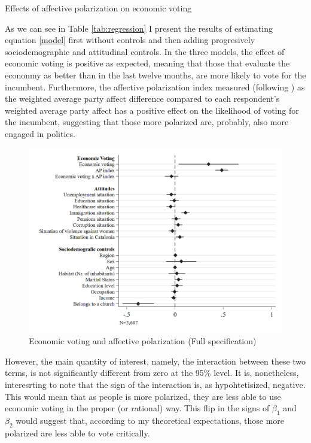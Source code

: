 \documentclass[a4paper, svgnames]{article}
\begin{document}
\begin{table}[H]
	\label{coefplot}
\centering
\caption{\label{tab:regression} Effects of affective polarization on economic voting}


\end{table}

As we can see in Table \ref*{tab:regression} I present the results of estimating equation \ref*{model} first without controls and then adding progresively sociodemographic and attitudinal controls. In the three models, the effect of economic voting is positive as expected, meaning that those that evaluate the econonmy as better than in the last twelve months, are more likely to vote for the incumbent. Furthermore, the affective polarization index measured (following \citep*{Wagner2021}) as the weighted average party affect difference compared to each respondent's weighted average party affect has a positive effect on the likelihood of voting for the incumbent, suggesting that those more polarized are, probably, also more engaged in politics.

\begin{figure}[H]
	\centering
	\includegraphics[scale=0.35]{Figures/model_3_coefplot.png}
	\caption{\label{fig:coefplot} Economic voting and affective polarization (Full specification)}
	\end{figure}

However, the main quantity of interest, namely, the interaction between these two terms, is not significantly different from zero at the 95\% level. It is, nonetheless, interesrting to note that the sign of the interaction is, as hypohtetisized, negative. This would mean that as people is more polarized, they are less able to use economic voting in the proper (or rational) way. This flip in the signs of $\beta_1$ and $\beta_2$ would suggest that, according to my theoretical expectations, those more polarized are less able to vote critically.
\end{document}
